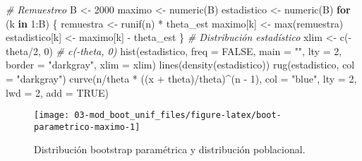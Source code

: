 \documentclass[
]{book}
\newenvironment{Shaded}{\begin{snugshade}}{\end{snugshade}}
\newcommand{\AttributeTok}[1]{\textcolor[rgb]{0.77,0.63,0.00}{#1}}
\newcommand{\CommentTok}[1]{\textcolor[rgb]{0.56,0.35,0.01}{\textit{#1}}}
\newcommand{\ConstantTok}[1]{\textcolor[rgb]{0.00,0.00,0.00}{#1}}
\newcommand{\ControlFlowTok}[1]{\textcolor[rgb]{0.13,0.29,0.53}{\textbf{#1}}}
\newcommand{\DecValTok}[1]{\textcolor[rgb]{0.00,0.00,0.81}{#1}}
\newcommand{\FunctionTok}[1]{\textcolor[rgb]{0.00,0.00,0.00}{#1}}
\newcommand{\NormalTok}[1]{#1}
\newcommand{\OtherTok}[1]{\textcolor[rgb]{0.56,0.35,0.01}{#1}}
\newcommand{\SpecialCharTok}[1]{\textcolor[rgb]{0.00,0.00,0.00}{#1}}
\newcommand{\StringTok}[1]{\textcolor[rgb]{0.31,0.60,0.02}{#1}}
\theoremstyle{break}
\theoremstyle{definition}
\theoremstyle{definition}
\theoremstyle{definition}
\theoremstyle{definition}
\theoremstyle{remark}
\begin{document}
\begin{Shaded}
\begin{Highlighting}[]
\CommentTok{\# Remuestreo}
\NormalTok{B }\OtherTok{\textless{}{-}} \DecValTok{2000}
\NormalTok{maximo }\OtherTok{\textless{}{-}} \FunctionTok{numeric}\NormalTok{(B)}
\NormalTok{estadistico }\OtherTok{\textless{}{-}} \FunctionTok{numeric}\NormalTok{(B)}
\ControlFlowTok{for}\NormalTok{ (k }\ControlFlowTok{in} \DecValTok{1}\SpecialCharTok{:}\NormalTok{B) \{}
\NormalTok{    remuestra }\OtherTok{\textless{}{-}} \FunctionTok{runif}\NormalTok{(n) }\SpecialCharTok{*}\NormalTok{ theta\_est}
\NormalTok{    maximo[k] }\OtherTok{\textless{}{-}} \FunctionTok{max}\NormalTok{(remuestra)}
\NormalTok{    estadistico[k] }\OtherTok{\textless{}{-}}\NormalTok{ maximo[k] }\SpecialCharTok{{-}}\NormalTok{ theta\_est}
\NormalTok{\}}
\CommentTok{\# Distribución estadístico}
\NormalTok{xlim }\OtherTok{\textless{}{-}} \FunctionTok{c}\NormalTok{(}\SpecialCharTok{{-}}\NormalTok{theta}\SpecialCharTok{/}\DecValTok{2}\NormalTok{, }\DecValTok{0}\NormalTok{) }\CommentTok{\# c({-}theta, 0)}
\FunctionTok{hist}\NormalTok{(estadistico, }\AttributeTok{freq =} \ConstantTok{FALSE}\NormalTok{, }\AttributeTok{main =} \StringTok{""}\NormalTok{, }\AttributeTok{lty =} \DecValTok{2}\NormalTok{, }
     \AttributeTok{border =} \StringTok{"darkgray"}\NormalTok{, }\AttributeTok{xlim =}\NormalTok{ xlim)}
\FunctionTok{lines}\NormalTok{(}\FunctionTok{density}\NormalTok{(estadistico))}
\FunctionTok{rug}\NormalTok{(estadistico, }\AttributeTok{col =} \StringTok{"darkgray"}\NormalTok{)}
\FunctionTok{curve}\NormalTok{(n}\SpecialCharTok{/}\NormalTok{theta }\SpecialCharTok{*}\NormalTok{ ((x }\SpecialCharTok{+}\NormalTok{ theta)}\SpecialCharTok{/}\NormalTok{theta)}\SpecialCharTok{\^{}}\NormalTok{(n }\SpecialCharTok{{-}} \DecValTok{1}\NormalTok{), }\AttributeTok{col =} \StringTok{"blue"}\NormalTok{, }\AttributeTok{lty =} \DecValTok{2}\NormalTok{, }\AttributeTok{lwd =} \DecValTok{2}\NormalTok{, }\AttributeTok{add =} \ConstantTok{TRUE}\NormalTok{)}
\end{Highlighting}
\end{Shaded}

\begin{figure}[!htb]

{\centering \texttt{[image: 03-mod\_boot\_unif\_files/figure-latex/boot-parametrico-maximo-1]} 

}

\caption{Distribución bootstrap paramétrica y distribución poblacional.}\label{fig:boot-parametrico-maximo}
\end{figure}
\end{document}
